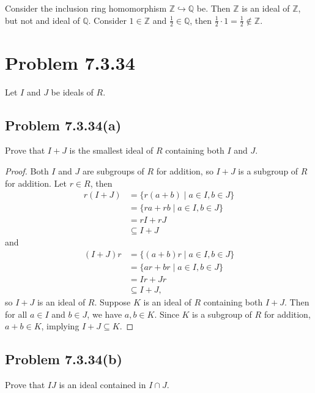 \documentclass[12pt]{article}
\newenvironment{problem}
    {\begin{lrbox}{\mybox}\begin{minipage}{0.98\textwidth}}
    {\end{minipage}\end{lrbox}\begin{center}\framebox[\textwidth]{\usebox{\mybox}}\end{center}}
\theoremstyle{definition}
\newcommand{\Z}{\mathbb{Z}}
\newcommand{\Q}{\mathbb{Q}}
\newcommand{\inc}{\hookrightarrow}
\begin{document}
Consider the inclusion ring homomorphism  $\Z \inc \Q$ be. Then $\Z$ is an ideal of $\Z$, but not and ideal of $\Q$. Consider $1 \in \Z$ and $\frac12 \in \Q$, then $\frac12\cdot 1 = \frac12 \notin\Z$.

\newpage
\section{Problem 7.3.34}
\begin{problem}
    Let $I$ and $J$ be ideals of $R$.
\end{problem}

\subsection{Problem 7.3.34(a)}
\begin{problem}
    Prove that $I + J$ is the smallest ideal of $R$ containing both $I$ and $J$.
\end{problem}

\begin{proof}
    Both $I$ and $J$ are subgroups of $R$ for addition, so $I + J$ is a subgroup of $R$ for addition. Let $r \in R$, then
    \begin{align*}
        r(I + J) 
            &= \{r(a + b) \mid a \in I, b \in J\} \\
            &= \{ra + rb \mid a \in I, b \in J\} \\
            &= rI + rJ \\
            &\subseteq I + J
    \end{align*}
    and
    \begin{align*}
        (I + J)r
            &= \{(a + b)r \mid a \in I, b \in J\} \\
            &= \{ar + br \mid a \in I, b \in J\} \\
            &= Ir + Jr \\
            &\subseteq I + J,
    \end{align*}
    so $I + J$ is an ideal of $R$. Suppose $K$ is an ideal of $R$ containing both $I + J$. Then for all $a \in I$ and $b \in J$, we have $a, b \in K$. Since $K$ is a subgroup of $R$ for addition, $a + b \in K$, implying $I + J \subseteq K$. 
    
\end{proof}

\newpage
\subsection{Problem 7.3.34(b)}
\begin{problem}
    Prove that $IJ$ is an ideal contained in $I \cap J$.
\end{problem}
\end{document}
